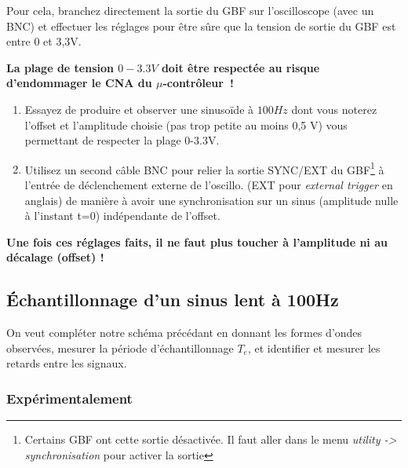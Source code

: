 \documentclass[a4paper,twoside,12pt]{report}           %
\begin{document}
Pour cela, branchez directement la sortie du GBF sur l'oscilloscope
(avec un BNC) et effectuer les réglages pour être sûre que la tension
de sortie du GBF est entre 0 et 3,3V.

\textbf{ La plage de tension $0-3.3V$ doit être respectée au risque
  d'endommager le CNA du $\mu$-contrôleur~!}

\begin{enumerate}
\item Essayez de produire et observer une sinusoïde à $100 Hz$ dont
  vous noterez l'offset et l'amplitude choisie (pas trop petite au
  moins 0,5 V) vous permettant de respecter la plage 0-3.3V.
\item Utilisez un second câble BNC pour relier la sortie SYNC/EXT du
  GBF\footnote{Certains GBF ont cette sortie désactivée. Il faut aller
    dans le menu \emph{utility -> synchronisation} pour activer la
    sortie} à l'entrée de déclenchement externe de l'oscillo. (EXT
  pour \emph{external trigger} en anglais) de manière à avoir une
  synchronisation sur un sinus (amplitude nulle à l'instant t=0)
  indépendante de l'offset.
\end{enumerate}

\textbf{Une fois ces réglages faits, il ne faut plus toucher à
  l'amplitude ni au décalage (offset) !}

\subsection{Échantillonnage d'un sinus lent à 100Hz}

On veut compléter notre schéma précédant en donnant les formes d'ondes
observées, mesurer la période d'échantillonnage $T_e$, et identifier
et mesurer les retards entre les signaux.

\subsubsection{Expérimentalement}
\end{document}
